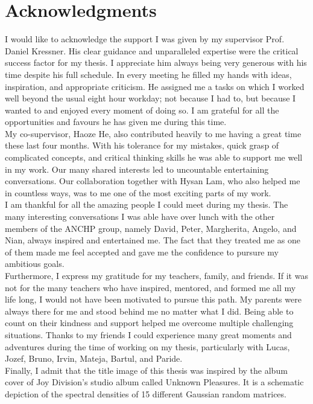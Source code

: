 \chapter*{Acknowledgments}
\label{chp:0-acknowledgments}

I would like to acknowledge the support I was given by my supervisor
Prof. Daniel Kressner. His clear guidance and unparalleled expertise were the
critical success factor for my thesis. I appreciate him always being very generous
with his time despite his full schedule. In every meeting he filled my hands with
ideas, inspiration, and appropriate criticism. He assigned me a tasks on which
I worked well beyond the usual eight hour workday; not because I had to, but because
I wanted to and enjoyed every moment of doing so. I am grateful for all the
opportunities and favours he has given me during this time.\\

My co-supervisor, Haoze He, also contributed heavily to me having a great time
these last four months. With his tolerance for my mistakes, quick grasp of
complicated concepts, and critical thinking skills he was able to support me
well in my work. Our many shared interests led to uncountable
entertaining conversations. Our collaboration together with Hysan Lam, who
also helped me in countless ways, was to me one of the most exciting parts of
my work.\\

I am thankful for all the amazing people I could meet during my thesis.
The many interesting conversations I was able have over lunch with
the other members of the ANCHP group, namely David, Peter,
Margherita, Angelo, and Nian, always inspired and entertained me.
The fact that they treated me as one of them made me feel accepted and gave 
me the confidence to pursure my ambitious goals.\\

Furthermore, I express my gratitude for my teachers, family, and friends.
If it was not for the many teachers who have inspired, mentored, and formed me
all my life long, I would not have been motivated to pursue this path.
My parents were always there for me and stood behind me no matter what I did.
Being able to count on their kindness and support helped me overcome multiple
challenging situations. Thanks to my friends I could experience many great moments and adventures
during the time of working on my thesis, particularly with Lucas, Jozef, Bruno,
Irvin, Mateja, Bartul, and Paride.\\ 

Finally, I admit that the title image of this thesis was inspired
by the album cover of Joy Division's studio album called Unknown Pleasures.
It is a schematic depiction of the spectral densities of 15 different Gaussian random matrices.
